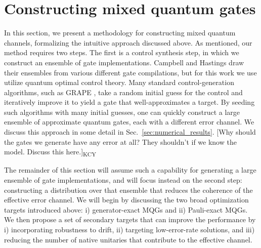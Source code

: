 \documentclass[aps,nofootinbib,pra,notitlepage,twocolumn]{revtex4-1}
\newcommand{\kcy}[1]{{\color{red}[#1]\textsubscript{\rm{KCY}}}}
\newcommand{\0}{\ensuremath{\mathbf{0}}}
\begin{document}



\section{Constructing mixed quantum gates}
\label{sec:mixed_unitary_processes}
\noindent In this section, we present a methodology for constructing mixed quantum channels, formalizing the intuitive approach discussed above. As mentioned, our method requires two steps. The first is a control synthesis step, in which we construct an ensemble of gate implementations. Campbell and Hastings draw their ensembles from various different gate compilations, but for this work we use utilize quantum optimal control theory. Many standard control-generation algorithms, such as GRAPE \cite{Khaneja2005}, take a random initial guess for the control and iteratively improve it to yield a gate that well-approximates a target. By seeding such algorithms with many initial guesses, one can quickly construct a large ensemble of approximate quantum gates, each with a different error channel. We discuss this approach in some detail in Sec.~\ref{sec:numerical_results}. \kcy{Why should the gates we generate have any error at all? They shouldn't if we know the model. Discuss this here.}

The remainder of this section will assume such a capability for generating a large ensemble of gate implementations, and will focus instead on the second step: constructing a distribution over that ensemble that reduces the coherence of the effective error channel. We will begin by discussing the two broad optimization targets introduced above: i) generator-exact MQGs and ii) Pauli-exact MQGs. We then propose a set of secondary targets that can improve the performance by i) incorporating robustness to drift, ii) targeting low-error-rate solutions, and iii) reducing the number of native unitaries that contribute to the effective channel. 
\end{document}
